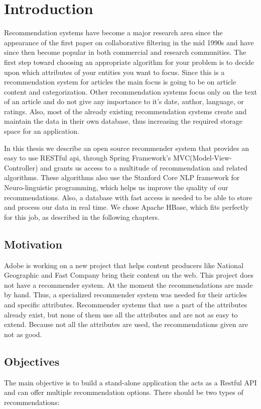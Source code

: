 \chapter{Introduction}
\label{chapter:intro}

Recommendation systems have become a major research area since the appearance of the first paper on collaborative filtering in the mid 1990s and have since then become popular in both commercial and research communities. The first step toward choosing an appropriate algorithm for your problem is to decide upon which attributes of your entities you want to focus. Since this is a recommendation system for articles the main focus is going to be on article content and categorization. Other recommendation systems focus only on the text of an article and do not give any importance to it's date, author, language, or ratings. Also, most of the already existing recommendation systems create and maintain the data in their own database, thus increasing the required storage space for an application. 

In this thesis we describe an open source recommender system that provides an easy to use RESTful api, through Spring Framework's MVC(Model-View-Controller) and grants us access to a multitude of recommendation and related algorithms. These algorithms also use the Stanford Core NLP framework for Neuro-linguistic programming, which helps us improve the quality of our recommendations. Also, a database with fast access is needed to be able to store and process our data in real time. We chose Apache HBase, which fits perfectly for this job, as described in the following chapters.

\section{Motivation}
\label{sec:motivation}
Adobe is working on a new project that helps content producers like National Geographic and Fast Company bring their content on the web. This project does not have a recommender system. At the moment the recommendations are made by hand. Thus, a specialized recommender system was needed for their articles and specific attributes. Recommender systems that use a part of the attributes already exist, but none of them use all the attributes and are not as easy to extend. Because not all the attributes are used, the recommendations given are not as good.

\section{Objectives}
\label{sec:objectives}
The main objective is to build a stand-alone application the acts as a Restful API and can offer multiple recommendation options. There should be two types of recommendations:

